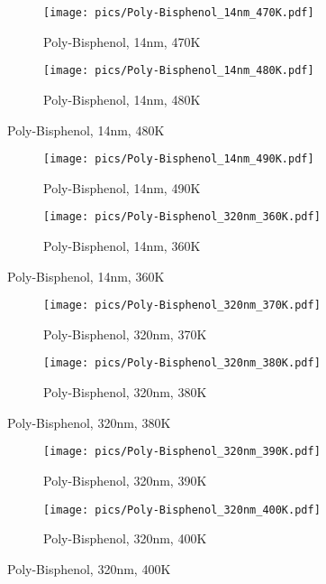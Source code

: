 \begin{figure}[!htb]
\centering
\begin{subfigure}[t]{.5\textwidth}
  \centering
  \texttt{[image: pics/Poly-Bisphenol\_14nm\_470K.pdf]}
  \caption{Poly-Bisphenol, 14nm, 470K}
  \label{fig:sub9}
\end{subfigure}%
\begin{subfigure}[t]{.5\textwidth}
  \centering
  \texttt{[image: pics/Poly-Bisphenol\_14nm\_480K.pdf]}
  \caption{Poly-Bisphenol, 14nm, 480K}
  \label{fig:sub10}
\end{subfigure}%
\end{figure}

\begin{figure}[!htb]
\centering
\begin{subfigure}[t]{.5\textwidth}
  \centering
  \texttt{[image: pics/Poly-Bisphenol\_14nm\_490K.pdf]}
  \caption{Poly-Bisphenol, 14nm, 490K}
  \label{fig:sub11}
\end{subfigure}%
\begin{subfigure}[t]{.5\textwidth}
  \centering
  \texttt{[image: pics/Poly-Bisphenol\_320nm\_360K.pdf]}
  \caption{Poly-Bisphenol, 14nm, 360K}
  \label{fig:sub12}
\end{subfigure}%
\end{figure}

\begin{figure}[!htb]
\centering
\begin{subfigure}[t]{.5\textwidth}
  \centering
  \texttt{[image: pics/Poly-Bisphenol\_320nm\_370K.pdf]}
  \caption{Poly-Bisphenol, 320nm, 370K}
  \label{fig:sub13}
\end{subfigure}%
\begin{subfigure}[t]{.5\textwidth}
  \centering
  \texttt{[image: pics/Poly-Bisphenol\_320nm\_380K.pdf]}
  \caption{Poly-Bisphenol, 320nm, 380K}
  \label{fig:sub14}
\end{subfigure}%
\end{figure}

\begin{figure}[!htb]
\centering
\begin{subfigure}[t]{.5\textwidth}
  \centering
  \texttt{[image: pics/Poly-Bisphenol\_320nm\_390K.pdf]}
  \caption{Poly-Bisphenol, 320nm, 390K}
  \label{fig:sub15}
\end{subfigure}%
\begin{subfigure}[t]{.5\textwidth}
  \centering
  \texttt{[image: pics/Poly-Bisphenol\_320nm\_400K.pdf]}
  \caption{Poly-Bisphenol, 320nm, 400K}
  \label{fig:sub16}
\end{subfigure}%
\end{figure}

